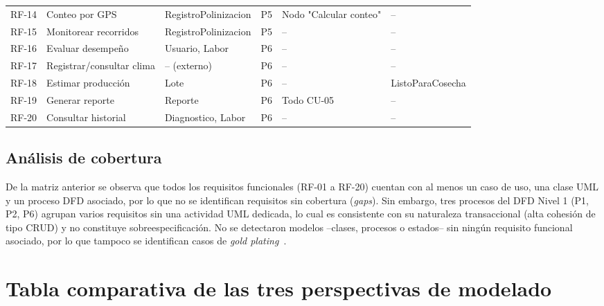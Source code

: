 \documentclass[11pt,a4paper]{report}
\begin{document}
\begin{landscape}
\begin{table}[htbp]
\begin{tabularx}{\linewidth}{|>{\hsize=0.5\hsize}X|>{\hsize=1.0\hsize}X|>{\hsize=1.0\hsize}X|>{\hsize=0.7\hsize}X|>{\hsize=0.7\hsize}X|>{\hsize=1.1\hsize}X|}
RF-14 & Conteo por GPS & RegistroPolinizacion & P5 & Nodo "Calcular conteo" & -- \\
RF-15 & Monitorear recorridos & RegistroPolinizacion & P5 & -- & -- \\
RF-16 & Evaluar desempeño & Usuario, Labor & P6 & -- & -- \\
RF-17 & Registrar/consultar clima & -- (externo) & P6 & -- & -- \\
RF-18 & Estimar producción & Lote & P6 & -- & ListoParaCosecha \\
RF-19 & Generar reporte & Reporte & P6 & Todo CU-05 & -- \\
RF-20 & Consultar historial & Diagnostico, Labor & P6 & -- & -- \\
\hline
\end{tabularx}
\end{table}
\end{landscape}

\subsection{Análisis de cobertura}

De la matriz anterior se observa que todos los requisitos funcionales (RF-01 a RF-20) cuentan con al
menos un caso de uso, una clase UML y un proceso DFD asociado, por lo que no se identifican requisitos
sin cobertura (\textit{gaps}). Sin embargo, tres procesos del DFD Nivel 1 (P1, P2, P6) agrupan
varios requisitos sin una actividad UML dedicada, lo cual es consistente con su naturaleza
transaccional (alta cohesión de tipo CRUD) y no constituye sobreespecificación. No se detectaron
modelos --clases, procesos o estados-- sin ningún requisito funcional asociado, por lo que tampoco se
identifican casos de \textit{gold plating}~\cite{ieee29148}.

\section{Tabla comparativa de las tres perspectivas de modelado}
\end{document}
